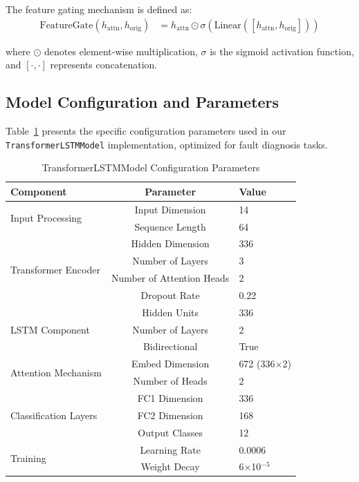 The feature gating mechanism is defined as:
\begin{align}
\text{FeatureGate}(h_{\text{attn}}, h_{\text{orig}}) &= h_{\text{attn}} \odot \sigma(\text{Linear}([h_{\text{attn}}, h_{\text{orig}}])) \label{eq:gate}
\end{align}

where $\odot$ denotes element-wise multiplication, $\sigma$ is the sigmoid activation function, and $[\cdot, \cdot]$ represents concatenation.

\subsection{Model Configuration and Parameters}
\label{subsec:model_configuration}

Table~\ref{tab:model_config} presents the specific configuration parameters used in our \texttt{TransformerLSTMModel} implementation, optimized for fault diagnosis tasks.

\begin{table}[htbp]
\centering
\caption{TransformerLSTMModel Configuration Parameters}
\label{tab:model_config}
\begin{tabular}{|l|c|l|}
\hline
\textbf{Component} & \textbf{Parameter} & \textbf{Value} \\
\hline
\multirow{2}{*}{Input Processing} & Input Dimension & 14 \\
 & Sequence Length & 64 \\
\hline
\multirow{4}{*}{Transformer Encoder} & Hidden Dimension & 336 \\
 & Number of Layers & 3 \\
 & Number of Attention Heads & 2 \\
 & Dropout Rate & 0.22 \\
\hline
\multirow{3}{*}{LSTM Component} & Hidden Units & 336 \\
 & Number of Layers & 2 \\
 & Bidirectional & True \\
\hline
\multirow{2}{*}{Attention Mechanism} & Embed Dimension & 672 (336$\times$2) \\
 & Number of Heads & 2 \\
\hline
\multirow{3}{*}{Classification Layers} & FC1 Dimension & 336 \\
 & FC2 Dimension & 168 \\
 & Output Classes & 12 \\
\hline
\multirow{2}{*}{Training} & Learning Rate & 0.0006 \\
 & Weight Decay & 6$\times$10$^{-5}$ \\
\hline
\end{tabular}
\end{table}

